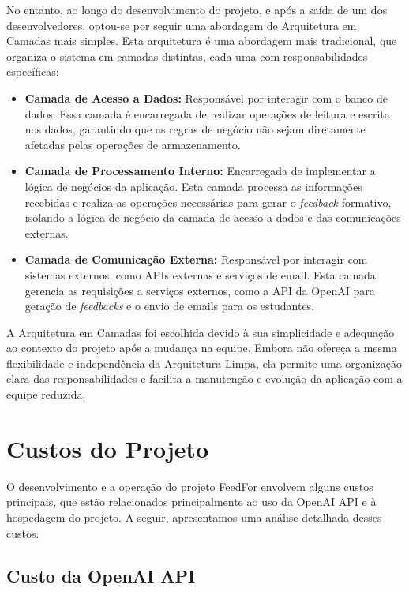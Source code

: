 No entanto, ao longo do desenvolvimento do projeto, e após a saída de um dos desenvolvedores, optou-se por seguir uma abordagem de Arquitetura em Camadas mais simples. Esta arquitetura é uma abordagem mais tradicional, que organiza o sistema em camadas distintas, cada uma com responsabilidades específicas:

\begin{itemize}
    \item \textbf{Camada de Acesso a Dados:} Responsável por interagir com o banco de dados. Essa camada é encarregada de realizar operações de leitura e escrita nos dados, garantindo que as regras de negócio não sejam diretamente afetadas pelas operações de armazenamento.
    \item \textbf{Camada de Processamento Interno:} Encarregada de implementar a lógica de negócios da aplicação. Esta camada processa as informações recebidas e realiza as operações necessárias para gerar o \textit{feedback} formativo, isolando a lógica de negócio da camada de acesso a dados e das comunicações externas.
    \item \textbf{Camada de Comunicação Externa:} Responsável por interagir com sistemas externos, como APIs externas e serviços de email. Esta camada gerencia as requisições a serviços externos, como a API da OpenAI para geração de \textit{feedbacks} e o envio de emails para os estudantes.
\end{itemize}

A Arquitetura em Camadas foi escolhida devido à sua simplicidade e adequação ao contexto do projeto após a mudança na equipe. Embora não ofereça a mesma flexibilidade e independência da Arquitetura Limpa, ela permite uma organização clara das responsabilidades e facilita a manutenção e evolução da aplicação com a equipe reduzida.

\section{Custos do Projeto}

O desenvolvimento e a operação do projeto FeedFor envolvem alguns custos principais, que estão relacionados principalmente ao uso da OpenAI API e à hospedagem do projeto. A seguir, apresentamos uma análise detalhada desses custos.

\subsection{Custo da OpenAI API}

